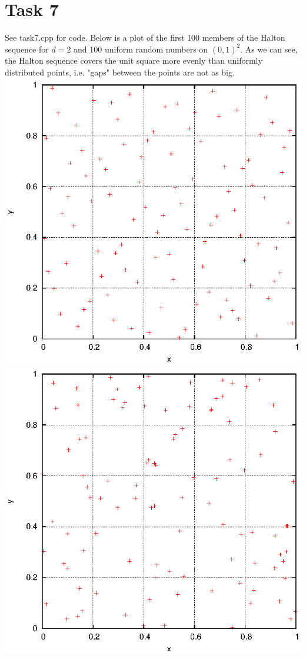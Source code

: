 \documentclass[]{article}
\begin{document}
\section*{Task 7}
See task7.cpp for code. Below is a plot of the first 100 members of the Halton sequence for $d=2$ and 100 uniform random numbers on $(0,1)^2$. As we can see, the Halton sequence covers the unit square more evenly than uniformly distributed points, i.e. "gaps" between the points are not as big.
\\
\includegraphics{task7_halton.eps}\\
\includegraphics{task7_uniform.eps}\\
\end{document}
